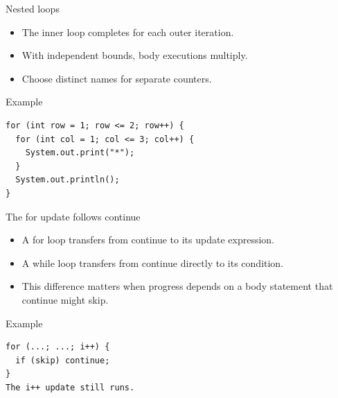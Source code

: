 \documentclass[10pt,aspectratio=169]{beamer}
\begin{document}
\begin{frame}[fragile,t]{Nested loops}
\begin{itemize}
\item The inner loop completes for each outer iteration.
\item With independent bounds, body executions multiply.
\item Choose distinct names for separate counters.
\end{itemize}
\vspace{1mm}\begin{block}{Example}
\begin{lstlisting}
for (int row = 1; row <= 2; row++) {
  for (int col = 1; col <= 3; col++) {
    System.out.print("*");
  }
  System.out.println();
}
\end{lstlisting}
\end{block}
\end{frame}

\begin{frame}[fragile,t]{The for update follows continue}
\begin{itemize}
\item A for loop transfers from continue to its update expression.
\item A while loop transfers from continue directly to its condition.
\item This difference matters when progress depends on a body statement that continue might skip.
\end{itemize}
\vspace{1mm}\begin{block}{Example}
\begin{lstlisting}
for (...; ...; i++) {
  if (skip) continue;
}
The i++ update still runs.
\end{lstlisting}
\end{block}
\end{frame}
\end{document}

